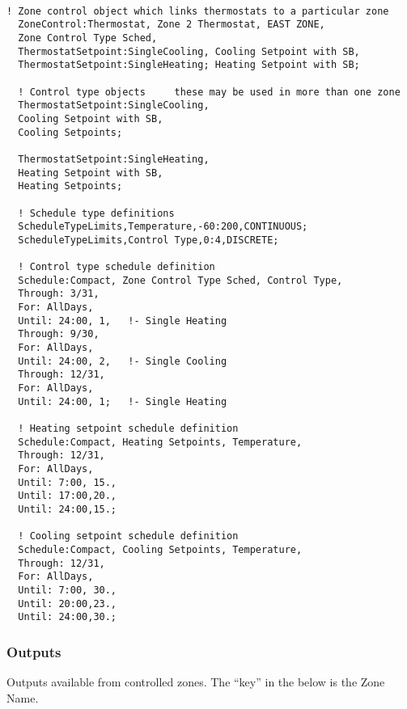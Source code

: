 \begin{lstlisting}

! Zone control object which links thermostats to a particular zone
  ZoneControl:Thermostat, Zone 2 Thermostat, EAST ZONE,
  Zone Control Type Sched,
  ThermostatSetpoint:SingleCooling, Cooling Setpoint with SB,
  ThermostatSetpoint:SingleHeating; Heating Setpoint with SB;

  ! Control type objects     these may be used in more than one zone
  ThermostatSetpoint:SingleCooling,
  Cooling Setpoint with SB,
  Cooling Setpoints;

  ThermostatSetpoint:SingleHeating,
  Heating Setpoint with SB,
  Heating Setpoints;

  ! Schedule type definitions
  ScheduleTypeLimits,Temperature,-60:200,CONTINUOUS;
  ScheduleTypeLimits,Control Type,0:4,DISCRETE;

  ! Control type schedule definition
  Schedule:Compact, Zone Control Type Sched, Control Type,
  Through: 3/31,
  For: AllDays,
  Until: 24:00, 1,   !- Single Heating
  Through: 9/30,
  For: AllDays,
  Until: 24:00, 2,   !- Single Cooling
  Through: 12/31,
  For: AllDays,
  Until: 24:00, 1;   !- Single Heating

  ! Heating setpoint schedule definition
  Schedule:Compact, Heating Setpoints, Temperature,
  Through: 12/31,
  For: AllDays,
  Until: 7:00, 15.,
  Until: 17:00,20.,
  Until: 24:00,15.;

  ! Cooling setpoint schedule definition
  Schedule:Compact, Cooling Setpoints, Temperature,
  Through: 12/31,
  For: AllDays,
  Until: 7:00, 30.,
  Until: 20:00,23.,
  Until: 24:00,30.;
\end{lstlisting}

\subsubsection{Outputs}\label{outputs-042}

Outputs available from controlled zones. The ``key'' in the below is the Zone Name.

